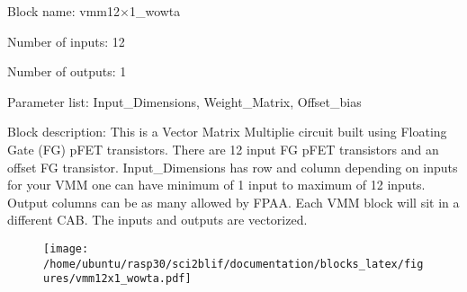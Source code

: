 \pagebreak
Block name: vmm12$\times$1\_wowta

Number of inputs: 12

Number of outputs: 1

Parameter list: Input\_Dimensions, Weight\_Matrix, Offset\_bias

Block description: 
This is a Vector Matrix Multiplie circuit built using Floating Gate (FG) pFET transistors. There are 12 input FG pFET transistors
and an offset FG transistor. Input\_Dimensions has row and column depending on inputs for your VMM one can have minimum of 1 input
to maximum of 12 inputs. Output columns can be as many allowed by FPAA. Each VMM block will sit in a different CAB. The inputs and
outputs are vectorized.

\begin{figure}[H]  %
\texttt{[image: /home/ubuntu/rasp30/sci2blif/documentation/blocks\_latex/figures/vmm12x1\_wowta.pdf]}
\end{figure}

